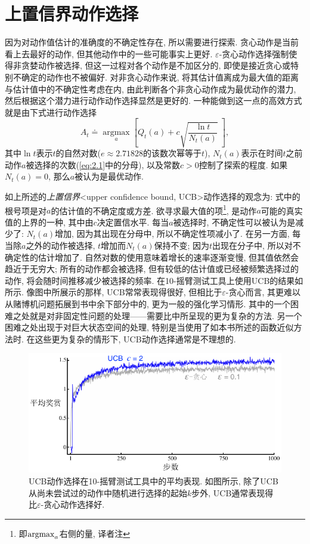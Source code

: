 \section{上置信界动作选择}\label{sec:2.7}

因为对动作值估计的准确度的不确定性存在, 所以需要进行探索. 贪心动作是当前看上去最好的动作, 但其他动作中的一些可能事实上更好. $\varepsilon$-贪心动作选择强制使得非贪婪动作被选择, 但这一过程对各个动作是不加区分的, 即使是接近贪心或特别不确定的动作也不被偏好. 对非贪心动作来说, 将其估计值离成为最大值的距离与估计值中的不确定性考虑在内, 由此判断各个非贪心动作成为最优动作的潜力, 然后根据这个潜力进行动作动作选择显然是更好的. 一种能做到这一点的高效方式就是由下式进行动作选择
\begin{equation}\label{eq:2.10}
A_t \doteq \underset{a}{\operatorname{argmax}} \left[ Q_t(a) + c \sqrt{\frac{\ln t}{N_t(a)}} \;\right],
\end{equation}
其中$\ln t$表示$t$的自然对数($e \approx 2.71828$的该数次幂等于$t$), $N_t(a)$表示在时间$t$之前动作$a$被选择的次数(\eqref{eq:2.1}中的分母), 以及常数$c > 0$控制了探索的程度. 如果$N_t(a) = 0$, 那么$a$被认为是最优动作.

如上所述的\emph{上置信界}<upper confidence bound, UCB>动作选择的观念为: 式中的根号项是对$a$的估计值的不确定度或方差. 欲寻求最大值的项\footnote{即$\operatorname*{argmax}_a$右侧的量, 译者注}, 是动作$a$可能的真实值的上界的一种, 其中由$c$决定置信水平. 每当$a$被选择时, 不确定性可以被认为是减少了: $N_t(a)$增加, 因为其出现在分母中, 所以不确定性项减小了. 在另一方面, 每当除$a$之外的动作被选择, $t$增加而$N_t(a)$保持不变; 因为$t$出现在分子中, 所以对不确定性的估计增加了. 自然对数的使用意味着增长的速率逐渐变慢, 但其值依然会趋近于无穷大; 所有的动作都会被选择, 但有较低的估计值或已经被频繁选择过的动作, 将会随时间推移减少被选择的频率. 在10-摇臂测试工具上使用UCB的结果如所示. 像图中所展示的那样, UCB常常表现得很好, 但相比于$\varepsilon$-贪心而言, 其更难以从赌博机问题拓展到书中余下部分中的, 更为一般的强化学习情形. 其中的一个困难之处就是对非固定性问题的处理——需要比中所呈现的更为复杂的方法. 另一个困难之处出现于对巨大状态空间的处理, 特别是当使用了如本书所述的函数近似方法时. 在这些更为复杂的情形下, UCB动作选择通常是不理想的. 

\begin{figure}[ht]
\centering
\includegraphics[width=.75\textwidth]{c2/img/figure2-4.pdf}
\caption{UCB动作选择在10-摇臂测试工具中的平均表现. 如图所示, 除了UCB从尚未尝试过的动作中随机进行选择的起始$k$步外, UCB通常表现得比$\varepsilon$-贪心动作选择好.}\label{fig:2.4}
\end{figure}


